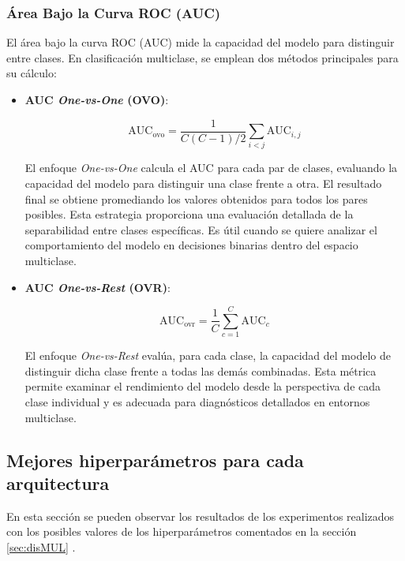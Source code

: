 \subsubsection*{Área Bajo la Curva ROC (AUC)}

El área bajo la curva ROC (AUC) mide la capacidad del modelo para distinguir entre clases. En clasificación multiclase, se emplean dos métodos principales para su cálculo:

\begin{itemize}

\item \textbf{AUC \textit{One-vs-One} (OVO)}:

\begin{equation}
\text{AUC}_{\text{ovo}} = \frac{1}{C(C-1)/2} \sum_{i<j} \text{AUC}_{i,j}
\end{equation}

El enfoque \textit{One-vs-One} calcula el AUC para cada par de clases, evaluando la capacidad del modelo para distinguir una clase frente a otra. El resultado final se obtiene promediando los valores obtenidos para todos los pares posibles. Esta estrategia proporciona una evaluación detallada de la separabilidad entre clases específicas. Es útil cuando se quiere analizar el comportamiento del modelo en decisiones binarias dentro del espacio multiclase.

\item \textbf{AUC \textit{One-vs-Rest} (OVR)}:

\begin{equation}
\text{AUC}_{\text{ovr}} = \frac{1}{C} \sum_{c=1}^{C} \text{AUC}_c
\end{equation}

El enfoque \textit{One-vs-Rest} evalúa, para cada clase, la capacidad del modelo de distinguir dicha clase frente a todas las demás combinadas. Esta métrica permite examinar el rendimiento del modelo desde la perspectiva de cada clase individual y es adecuada para diagnósticos detallados en entornos multiclase.

\end{itemize}


\subsection{Mejores hiperparámetros para cada arquitectura}
En esta sección se pueden observar los resultados de los experimentos realizados con los posibles valores de los hiperparámetros comentados en la sección \ref{sec:disMUL} .

